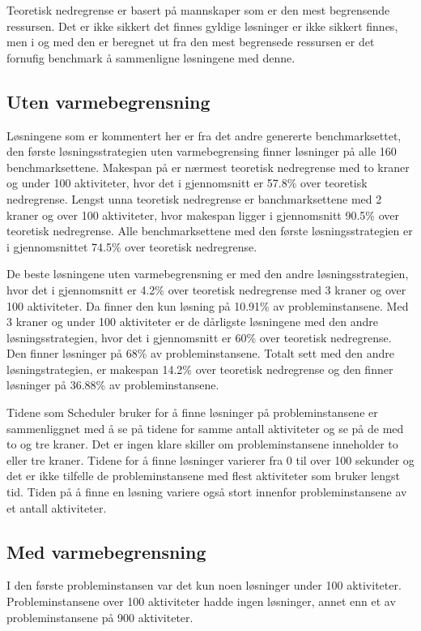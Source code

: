 Teoretisk nedregrense er basert på mannskaper som er den mest begrensende ressursen. Det er ikke sikkert det finnes gyldige løsninger er ikke sikkert finnes, men i og med den er beregnet ut fra den mest begrensede ressursen er det fornufig benchmark å sammenligne løsningene med denne.

\subsection{Uten varmebegrensning}
Løsningene som er kommentert her er fra det andre genererte benchmarksettet, den første løsningsstrategien uten varmebegrensing finner løsninger på alle 160 benchmarksettene. Makespan på er nærmest teoretisk nedregrense med to kraner og under 100 aktiviteter, hvor det i gjennomsnitt er 57.8\% over teoretisk nedregrense. Lengst unna teoretisk nedregrense er banchmarksettene med 2 kraner og over 100 aktiviteter, hvor makespan ligger i gjennomsnitt 90.5\% over teoretisk nedregrense. Alle benchmarksettene med den første løsningsstrategien er i gjennomsnittet 74.5\% over teoretisk nedregrense.

De beste løsningene uten varmebegrensning er med den andre løsningsstrategien, hvor det i gjennomsnitt er 4.2\% over teoretisk nedregrense med 3 kraner og over 100 aktiviteter. Da finner den kun løsning på 10.91\% av probleminstansene. Med 3 kraner og under 100 aktiviteter er de dårligste løsningene med den andre løsningsstrategien, hvor det i gjennomsnitt er 60\% over teoretisk nedregrense. Den finner løsninger på 68\% av probleminstansene. Totalt sett med den andre løsningstrategien, er makespan 14.2\% over teoretisk nedregrense og den finner løsninger på 36.88\% av probleminstansene.

Tidene som Scheduler bruker for å finne løsninger på probleminstansene er sammenliggnet med å se på tidene for samme antall aktiviteter og se på de med to og tre kraner. Det er ingen klare skiller om probleminstansene inneholder to eller tre kraner. Tidene for å finne løsninger varierer fra 0 til over 100 sekunder og det er ikke tilfelle de probleminstansene med flest aktiviteter som bruker lengst tid. Tiden på å finne en løsning variere også stort innenfor probleminstansene av et antall aktiviteter.

\subsection{Med varmebegrensning}
I den første probleminstansen var det kun noen løsninger under 100 aktiviteter. Probleminstansene over 100 aktiviteter hadde ingen løsninger, annet enn et av probleminstansene på 900 aktiviteter.

